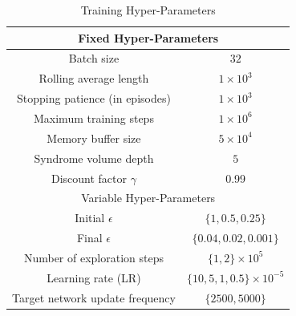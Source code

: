 \documentclass[twocolumn,preprintnumbers,amsmath,amssymb,notitlepage,nofootinbib,longbibliography,superscriptaddress,aps,pra,10pt]{revtex4-1}
\begin{document}
	\begin{table}
	\begin{center}
	  \begin{tabular}{| c | c | }
	    \hline
	    \multicolumn{2}{|c|}{Fixed Hyper-Parameters} \\
	    \hline
	    Batch size & $32$  \\ 
	    Rolling average length & $1\times10^3$ \\ 
	    Stopping patience (in episodes) & $1\times10^3$  \\
	    Maximum training steps & $1\times10^6$  \\ 
	    Memory buffer size & $5\times 10^4$ \\ 
	    Syndrome volume depth & $5$ \\
	    Discount factor $\gamma$ & 0.99 \\
	    \hline
	    \multicolumn{2}{|c|}{Variable Hyper-Parameters} \\
	    \hline
	    Initial $\epsilon$ & $\{1, 0.5, 0.25\}$ \\ 
	    Final $\epsilon$ & $\{0.04, 0.02, 0.001\}$  \\
	    Number of exploration steps & $\{1,2\}\times10^5$  \\ 
	    Learning rate (LR)& $\{10,5,1,0.5\}\times10^{-5}$  \\ 
	    Target network update frequency & $\{2500, 5000\}$ \\ 
	    \hline
	  \end{tabular}\caption{Training Hyper-Parameters}\label{t:hyper_parameters}
	\end{center}
	\end{table}
\end{document}
